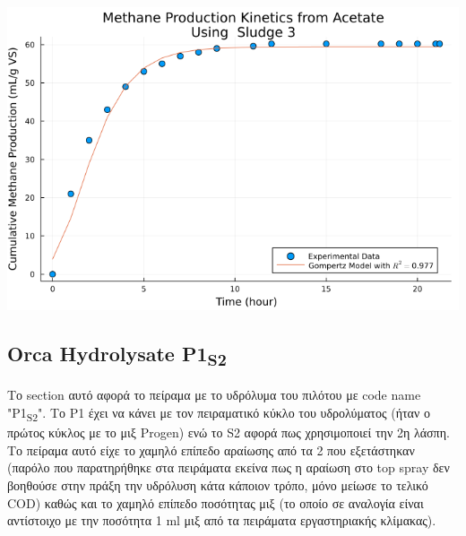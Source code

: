 \documentclass[11pt]{article}
\begin{document}
\begin{center}
\includegraphics[width=.9\linewidth]{../plots/BMPs/Acetate/specific_methane_kinetics_acet_test_s3_min.png}
\end{center}

\subsection{Orca Hydrolysate P1\textsubscript{S2}}
\label{sec:orgdbaea15}
Το section αυτό αφορά το πείραμα με το υδρόλυμα του πιλότου με code name "P1\textsubscript{S2}". Το P1 έχει να κάνει με τον πειραματικό κύκλο του υδρολύματος (ήταν ο πρώτος κύκλος με το μιξ Progen) ενώ το S2 αφορά πως χρησιμοποιεί την 2η λάσπη. Το πείραμα αυτό είχε το χαμηλό επίπεδο αραίωσης από τα 2 που εξετάστηκαν (παρόλο που παρατηρήθηκε στα πειράματα εκείνα πως η αραίωση στο top spray δεν βοηθούσε στην πράξη την υδρόλυση κάτα κάποιον τρόπο, μόνο μείωσε το τελικό COD) καθώς και το χαμηλό επίπεδο ποσότητας μιξ (το οποίο σε αναλογία είναι αντίστοιχο με την ποσότητα 1 ml μιξ από τα πειράματα εργαστηριακής κλίμακας). 
\end{document}
